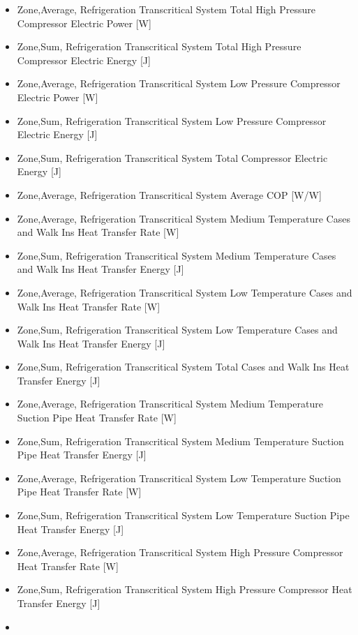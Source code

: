\begin{itemize}
\item
  Zone,Average, Refrigeration Transcritical System Total High Pressure Compressor Electric Power {[}W{]}
\item
  Zone,Sum, Refrigeration Transcritical System Total High Pressure Compressor Electric Energy {[}J{]}
\item
  Zone,Average, Refrigeration Transcritical System Low Pressure Compressor Electric Power {[}W{]}
\item
  Zone,Sum, Refrigeration Transcritical System Low Pressure Compressor Electric Energy {[}J{]}
\item
  Zone,Sum, Refrigeration Transcritical System Total Compressor Electric Energy {[}J{]}
\item
  Zone,Average, Refrigeration Transcritical System Average COP {[}W/W{]}
\item
  Zone,Average, Refrigeration Transcritical System Medium Temperature Cases and Walk Ins Heat Transfer Rate {[}W{]}
\item
  Zone,Sum, Refrigeration Transcritical System Medium Temperature Cases and Walk Ins Heat Transfer Energy {[}J{]}
\item
  Zone,Average, Refrigeration Transcritical System Low Temperature Cases and Walk Ins Heat Transfer Rate {[}W{]}
\item
  Zone,Sum, Refrigeration Transcritical System Low Temperature Cases and Walk Ins Heat Transfer Energy {[}J{]}
\item
  Zone,Sum, Refrigeration Transcritical System Total Cases and Walk Ins Heat Transfer Energy {[}J{]}
\item
  Zone,Average, Refrigeration Transcritical System Medium Temperature Suction Pipe Heat Transfer Rate {[}W{]}
\item
  Zone,Sum, Refrigeration Transcritical System Medium Temperature Suction Pipe Heat Transfer Energy {[}J{]}
\item
  Zone,Average, Refrigeration Transcritical System Low Temperature Suction Pipe Heat Transfer Rate {[}W{]}
\item
  Zone,Sum, Refrigeration Transcritical System Low Temperature Suction Pipe Heat Transfer Energy {[}J{]}
\item
  Zone,Average, Refrigeration Transcritical System High Pressure Compressor Heat Transfer Rate {[}W{]}
\item
  Zone,Sum, Refrigeration Transcritical System High Pressure Compressor Heat Transfer Energy {[}J{]}
\item

\end{itemize}
